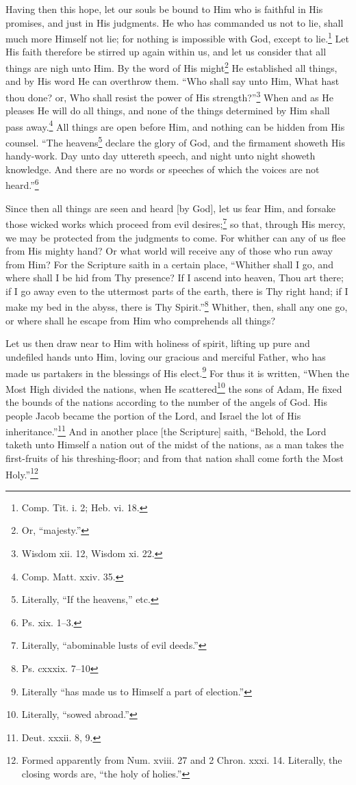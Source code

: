 Having then this hope, let our souls be bound to Him who is faithful in His promises, and just in His judgments. He who has commanded us not to lie, shall much more Himself not lie; for nothing is impossible with God, except to lie.\footnote{Comp. Tit. i. 2; Heb. vi. 18.} Let His faith therefore be stirred up again within us, and let us consider that all things are nigh unto Him. By the word of His might\footnote{Or, “majesty.”} He established all things, and by His word He can overthrow them. “Who shall say unto Him, What hast thou done? or, Who shall resist the power of His strength?”\footnote{Wisdom xii. 12, Wisdom xi. 22.} When and as He pleases He will do all things, and none of the things determined by Him shall pass away.\footnote{Comp. Matt. xxiv. 35.} All things are open before Him, and nothing can be hidden from His counsel. “The heavens\footnote{Literally, “If the heavens,” etc.} declare the glory of God, and the firmament showeth His handy-work. Day unto day uttereth speech, and night unto night showeth knowledge. And there are no words or speeches of which the voices are not heard.”\footnote{Ps. xix. 1–3.}


Since then all things are seen and heard [by God], let us fear Him, and forsake those wicked works which proceed from evil desires;\footnote{Literally, “abominable lusts of evil deeds.”} so that, through His mercy, we may be protected from the judgments to come. For whither can any of us flee from His mighty hand? Or what world will receive any of those who run away from Him? For the Scripture saith in a certain place, “Whither shall I go, and where shall I be hid from Thy presence? If I ascend into heaven, Thou art there; if I go away even to the uttermost parts of the earth, there is Thy right hand; if I make my bed in the abyss, there is Thy Spirit.”\footnote{Ps. cxxxix. 7–10} Whither, then, shall any one go, or where shall he escape from Him who comprehends all things?


Let us then draw near to Him with holiness of spirit, lifting up pure and undefiled hands unto Him, loving our gracious and merciful Father, who has made us partakers in the blessings of His elect.\footnote{Literally “has made us to Himself a part of election.”} For thus it is written, “When the Most High divided the nations, when He scattered\footnote{Literally, “sowed abroad.”} the sons of Adam, He fixed the bounds of the nations according to the number of the angels of God. His people Jacob became the portion of the Lord, and Israel the lot of His  inheritance.”\footnote{Deut. xxxii. 8, 9.} And in another place [the Scripture] saith, “Behold, the Lord taketh unto Himself a nation out of the midst of the nations, as a man takes the first-fruits of his threshing-floor; and from that nation shall come forth the Most Holy.”\footnote{Formed apparently from Num. xviii. 27 and 2 Chron. xxxi. 14. Literally, the closing words are, “the holy of holies.”}

